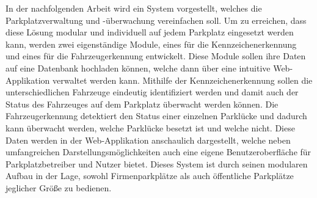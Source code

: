 In der nachfolgenden Arbeit wird ein System vorgestellt, welches die Parkplatzverwaltung und -überwachung vereinfachen soll. 
Um zu erreichen, dass diese Lösung modular und individuell auf jedem Parkplatz eingesetzt werden kann, werden zwei eigenständige Module, 
eines für die Kennzeichenerkennung und eines für die Fahrzeugerkennung entwickelt. Diese Module sollen ihre Daten auf eine Datenbank 
hochladen können, welche dann über eine intuitive Web-Applikation verwaltet werden kann. Mithilfe der Kennzeichenerkennung sollen die 
unterschiedlichen Fahrzeuge eindeutig identifiziert werden und damit auch der Status des Fahrzeuges auf dem Parkplatz überwacht werden können. 
Die Fahrzeugerkennung detektiert den Status einer einzelnen Parklücke und dadurch kann überwacht werden, welche Parklücke besetzt ist und welche 
nicht. Diese Daten werden in der Web-Applikation anschaulich dargestellt, welche neben umfangreichen Darstellungsmöglichkeiten auch eine eigene 
Benutzeroberfläche für Parkplatzbetreiber und Nutzer bietet. Dieses System ist durch seinen modularen Aufbau in der Lage, sowohl Firmenparkplätze 
als auch öffentliche Parkplätze jeglicher Größe zu bedienen.
